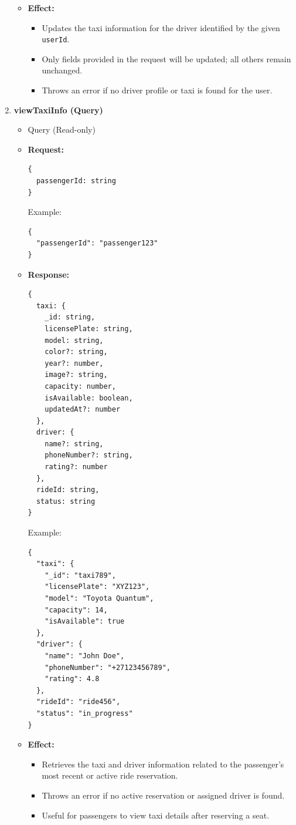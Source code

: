\documentclass[a4paper,12pt]{article}
\begin{document}
\begin{enumerate}
\begin{itemize}
      \item \textbf{Effect:}
      \begin{itemize}
        \item Updates the taxi information for the driver identified by the given \texttt{userId}.
        \item Only fields provided in the request will be updated; all others remain unchanged.
        \item Throws an error if no driver profile or taxi is found for the user.
      \end{itemize}
    \end{itemize}

\item \textbf{viewTaxiInfo (Query)}
    \begin{itemize}
      \item Query (Read-only)
      \item \textbf{Request:}
      \begin{verbatim}
{
  passengerId: string
}
      \end{verbatim}
      Example:
      \begin{verbatim}
{
  "passengerId": "passenger123"
}
      \end{verbatim}

      \item \textbf{Response:}
      \begin{verbatim}
{
  taxi: {
    _id: string,
    licensePlate: string,
    model: string,
    color?: string,
    year?: number,
    image?: string,
    capacity: number,
    isAvailable: boolean,
    updatedAt?: number
  },
  driver: {
    name?: string,
    phoneNumber?: string,
    rating?: number
  },
  rideId: string,
  status: string
}
      \end{verbatim}
      Example:
      \begin{verbatim}
{
  "taxi": {
    "_id": "taxi789",
    "licensePlate": "XYZ123",
    "model": "Toyota Quantum",
    "capacity": 14,
    "isAvailable": true
  },
  "driver": {
    "name": "John Doe",
    "phoneNumber": "+27123456789",
    "rating": 4.8
  },
  "rideId": "ride456",
  "status": "in_progress"
}
      \end{verbatim}

      \item \textbf{Effect:}
      \begin{itemize}
        \item Retrieves the taxi and driver information related to the passenger's most recent or active ride reservation.
        \item Throws an error if no active reservation or assigned driver is found.
        \item Useful for passengers to view taxi details after reserving a seat.
      \end{itemize}
    \end{itemize}

\end{enumerate}
\end{document}
